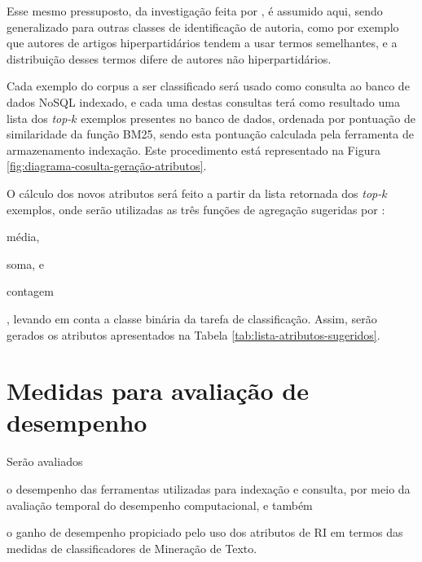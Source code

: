     Esse mesmo pressuposto, da investigação feita por , é assumido aqui, sendo generalizado para outras classes de identificação de autoria, como por exemplo que autores de artigos hiperpartidários tendem a usar termos semelhantes, e a distribuição desses termos difere de autores não hiperpartidários.
    
    
    
    Cada exemplo do corpus a ser classificado será usado como consulta ao banco de dados NoSQL indexado, e cada uma destas consultas terá como resultado uma lista dos \textit{top-$k$} exemplos presentes no banco de dados, ordenada por pontuação de similaridade da função BM25, sendo esta pontuação calculada pela ferramenta de armazenamento indexação. Este procedimento está representado na Figura \ref{fig:diagrama-cosulta-geração-atributos}.
    
    O cálculo dos novos atributos será feito a partir da lista retornada dos \textit{top-$k$} exemplos, onde serão utilizadas as três funções de agregação sugeridas por :
    \begin{enumerate*}[label=(\alph*)]
        \item média,
        \item soma, e
        \item contagem
    \end{enumerate*}, 
    levando em conta a classe binária da tarefa de classificação. 
    Assim, serão gerados os atributos apresentados na Tabela \ref{tab:lista-atributos-sugeridos}.
    
    

\section{Medidas para avaliação de desempenho}  \label{sec:Medidas-para-avaliação-de-desempenho}
    Serão avaliados
    \begin{enumerate*}[label=(\alph*)]
        \item o desempenho das ferramentas utilizadas para indexação e consulta, por meio da avaliação temporal do desempenho computacional, e também
        \item o ganho de desempenho propiciado pelo uso dos atributos de RI em termos das medidas de classificadores de Mineração de Texto. 
    \end{enumerate*} 
    
